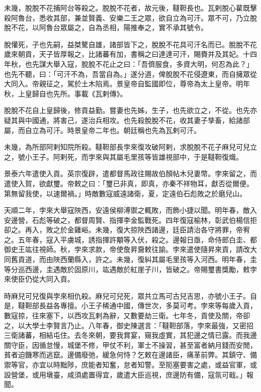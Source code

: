 \begin{pinyinscope}
未幾，脫脫不花捕阿台等殺之。脫脫不花者，故元後，韃靼長也。瓦剌脫心雚既擊殺阿魯台，悉收其部，兼並賢義、安樂二王之眾，欲自立為可汗。眾不可，乃立脫脫不花，以阿魯台眾屬之，自為丞相，陽推奉之，實不承其號令。

脫懽死，子也先嗣，益桀驁自雄，諸部皆下之，脫脫不花具可汗名而已。脫脫不花歲來朝貢，天子皆厚報之，比諸蕃有加，書稱之曰達達可汗，賜賚并及其妃。十四年秋，也先謀大舉入寇，脫脫不花止之曰：「吾儕服食，多資大明，何忍為此？」也先不聽，曰：「可汗不為，吾當自為。」遂分道，俾脫脫不花侵遼東，而自擁眾從大同入。帝親征之，駕於土木陷焉。景皇帝自監國即位，尊帝為太上皇帝。明年秋，上皇歸自也先所。事載《瓦剌傳》。

脫脫不花自上皇歸後，修貢益勤。嘗妻也先姊，生子，也先欲立之，不從。也先亦疑其與中國通，將害己，遂治兵相攻。也先殺脫脫不花，收其妻子孳畜，給諸部屬，而自立為可汗。時景皇帝二年也。朝廷稱也先為瓦剌可汗。

未幾，為所部阿剌知院所殺。韃靼部長孛來復攻破阿剌，求脫脫不花子麻兒可兒立之，號小王子。阿剌死，而孛來與其屬毛里孩等皆雄視部中，于是韃靼復熾。

景泰六年遣使入貢。英宗復辟，遣都督馬政往賜故伯顏帖木兒妻幣。孛來留之，而遣使入賀，欲獻璽。帝敕之曰：「璽已非真，即真，亦秦不祥物耳，獻否從爾便。第無留我使，以速爾禍。」時敵數寇威遠諸衛，夏，定遠伯石彪敗之於磨兒山。

天順二年，孛來大舉寇陜西，安遠侯柳溥禦之輒敗，而飾小捷以聞。明年春，敵入安邊營，石彪等破之，都督周賢、指揮李金監戰死。四年復寇榆林，彰武伯楊信拒卻之。再入，敗之於金雞峪。未幾，復大掠陜西諸邊，廷臣請治各守將罪，帝宥之。五年春，寇入平虜城，誘指揮許顒等入伏，殺之。邊報日亟，命侍郎白圭、都御史王竑往視師。秋，孛來求款，帝使詹昇齎敕往諭。孛來遣使隨昇來貢，請改大同舊貢道，而由陜西蘭縣入，許之。未幾，復糾其屬毛里孩等入河西。明年春，圭等分巡西邊，圭遇敵於固原川，竑遇敵於紅崖子川，皆破之。帝賜璽書獎勵，敕孛來使臣仍從大同入貢。

時麻兒可兒復與孛來相仇殺。麻兒可兒死，眾共立馬可古兒吉思，亦號小王子。自是，韃靼部長益各專擅。小王子稀通中國，傳世次，多莫可考。孛來等每歲入貢，數寇掠，往來塞下，以西攻瓦剌為辭，又數要劫三衛。七年冬，貢使及關，帝卻之，以大學士李賢言乃止。八年春，御史陳選言：「韃靼部落，孛來最強，又密招三衛諸蕃，相結屯住。去冬來朝，要我賞宴，窺我虛實，其犯邊之情已露。而我邊關守臣，因循怠慢，城堡不修，甲仗不利，軍士不操習，甚至富者納月錢而安閒，貧者迫饑寒而逃竄。邊備廢弛，緩急何恃？乞敕在邊諸臣，痛革前弊。其鎮守、備禦等官，亦宜以時黜陟，庶能者知奮，怠者知警。至阨塞要害之處，或益官軍，或設營堡，或用墩臺，咸須處置得宜，歲遣大臣巡視，庶邊防有備，寇氛可戢。」報聞。


\end{pinyinscope}
